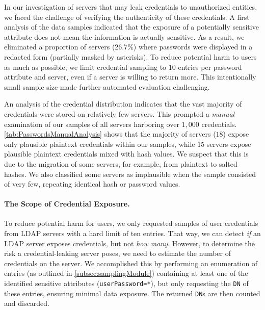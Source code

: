 In our investigation of servers that may leak credentials to unauthorized entities, we faced the challenge of verifying the authenticity of these credentials. A first analysis of the data samples indicated that the exposure of a potentially sensitive attribute does not mean the information is actually sensitive. As a result, we eliminated a proportion of servers (26.7\%) where passwords were displayed in a redacted form (\eg partially masked by asterisks). To reduce potential harm to users as much as possible, we limit credential sampling to 10 entries per password attribute and server, even if a server is willing to return more. This intentionally small sample size made further automated evaluation challenging.

An analysis of the credential distribution indicates %
that the vast majority of credentials were stored on relatively few servers. This prompted a \textit{manual} examination of our samples of all servers harboring over $1,000$ credentials. \cref{tab:PasswordsManualAnalysis} shows that the majority of servers ($18$) expose only plausible plaintext credentials within our samples, while $15$ servers expose plausible plaintext credentials mixed with hash values. We suspect that this is due to the migration of some servers, for example, from plaintext to salted hashes. We also classified some servers as implausible when the sample consisted of very few, repeating identical hash or password values.


\paragraph{The Scope of Credential Exposure.}


% 

To reduce potential harm for users, we only requested samples of user credentials from \gls{LDAP} servers with a hard limit of ten entries. That way, we can detect \emph{if} an LDAP server exposes credentials, but not \emph{how many}. However, to determine the risk a credential-leaking server poses, we need to estimate the number of credentials on the server. We accomplished this by performing an enumeration of entries (as outlined in \cref{subsec:samplingModule}) containing at least one of the identified sensitive attributes (\eg \texttt{userPassword=*}), but only requesting the \texttt{DN} of these entries, ensuring minimal data exposure. The returned \texttt{DN}s are then counted and discarded.

